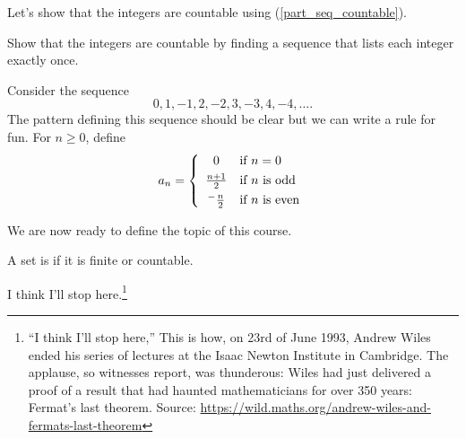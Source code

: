 Let's show that the integers are countable using  (\ref{part_seq_countable}).

\begin{exam}
\label{exam_integers_countable}
    Show that the integers are countable by finding a sequence that lists each integer exactly once.
        \begin{soln}
            Consider the sequence $$0,1,-1,2,-2,3,-3,4,-4, \ldots.$$
            The pattern defining this sequence should be clear but we can write a rule for fun.  For $n \ge 0$, define
                $$a_n = \left\{  
                \begin{array}{cl}
                    0 & \text{if } n=0 \vspace{.05in}\\
                    \frac{n+1}{2} & \text{if } n\text{ is odd} \vspace{.05in}\\
                    ^-\frac{n}{2} & \text{if } n\text{ is even} 
                \end{array}
                \right.$$
        \end{soln}
\end{exam}





We are now ready to define the topic of this course.

\begin{defn}[Discrete]
\label{defn_discrete}
   A set is  if it is finite or countable.
\end{defn}

I think I'll stop here.\footnote{``I think I'll stop here,'' This is how, on 23rd of June 1993, Andrew Wiles ended his series of lectures at the Isaac Newton Institute in Cambridge. The applause, so witnesses report, was thunderous: Wiles had just delivered a proof of a result that had haunted mathematicians for over 350 years: Fermat's last theorem. Source: \url{https://wild.maths.org/andrew-wiles-and-fermats-last-theorem}}








